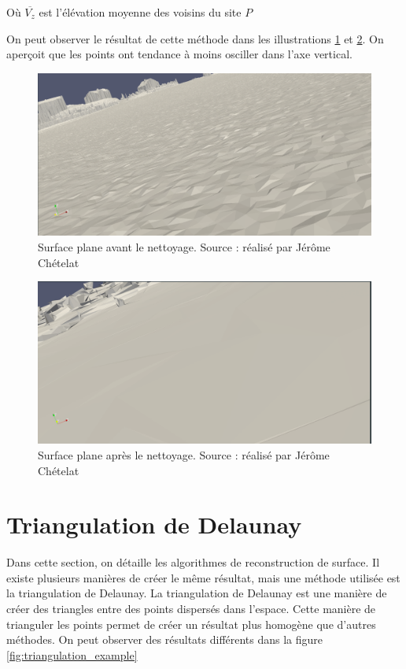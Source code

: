 Où $\overline{V_z}$ est l'élévation moyenne des voisins du site $P$

On peut observer le résultat de cette méthode dans les illustrations \ref{fig:before_las_filter} et
\ref{fig:after_las_filter}.
On aperçoit que les points ont tendance à moins osciller dans l'axe vertical.

\begin{figure}[htbp!]
    \centering
    \includegraphics[width=0.8\linewidth]{figures/lissage_brut.png}
    \caption{Surface plane avant le nettoyage. Source : réalisé par Jérôme Chételat}
    \label{fig:before_las_filter}
\end{figure}
\begin{figure}[htbp!]
    \centering
    \includegraphics[width=0.8\linewidth]{figures/lissage_filtrer.png}
    \caption{Surface plane après le nettoyage. Source : réalisé par Jérôme Chételat}
    \label{fig:after_las_filter}
\end{figure}

\section{Triangulation de Delaunay}
Dans cette section, on détaille les algorithmes de reconstruction de surface.
Il existe plusieurs manières de créer le même résultat, mais une méthode utilisée est la triangulation de Delaunay.
La triangulation de Delaunay est une manière de créer des triangles entre des points dispersés dans l’espace.
Cette manière de trianguler les points permet de créer un résultat plus homogène que d’autres méthodes.
On peut observer des résultats différents dans la figure
\ref{fig:triangulation_example}

